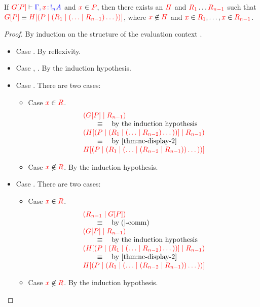\begin{lemma}\label{thm:nc-display-3}
  If $\seq[{ \cpPlug{G}{P} }]{ \Gamma, \tmty{x}{\take[n]{A}} }$ and
  $\freeIn{x}{P}$, then there exists an $\tm{H}$ and $\tm{R_1}\dots\tm{R_{n-1}}$
  such that $\tm{\cpPlug{G}{P}} \equiv
  \tm{\cpPlug{H}{\ncPool{P}{\ncPool{R_1}{\ncPool{\dots}{R_{n-1}}\dots}}}}$,
  where $\notFreeIn{x}{H}$ and $\freeIn{x}{R_1},\dots,\freeIn{x}{R_{n-1}}$.
\end{lemma}
\begin{proof}
  By induction on the structure of the evaluation context .
  \begin{itemize}
  \item Case \tm{\Box}. By reflexivity.
  \item Case , . By the induction hypothesis.
  \item Case . There are two cases:
    \begin{itemize}
    \item Case $\freeIn{x}{R}$.
      \[
        \begin{array}{l}
          \tm{\ncPool{\cpPlug{G}{P}}{R_{n-1}}} \\
          \qquad \equiv \quad \text{by the induction hypothesis} \\ 
          \tm{\ncPool{\cpPlug{H}{\ncPool{P}{\ncPool{R_1}{\ncPool{\dots}{R_{n-2}}\dots}}}}{R_{n-1}}} \\
          \qquad \equiv \quad \text{by \cref{thm:nc-display-2}} \\
          \tm{\cpPlug{H}{\ncPool{P}{\ncPool{R_1}{\ncPool{\dots}{\ncPool{R_{n-2}}{R_{n-1}}}\dots}}}}
        \end{array}
      \]
    \item Case $\notFreeIn{x}{R}$. By the induction hypothesis.
    \end{itemize}
  \item Case . There are two cases:
    \begin{itemize}
    \item Case $\freeIn{x}{R}$.
      \[
        \begin{array}{ll}
          \tm{\ncPool{R_{n-1}}{\cpPlug{G}{P}}} \\
          \qquad \equiv \quad \text{by} \; \ncEquivPoolComm \\ 
          \tm{\ncPool{\cpPlug{G}{P}}{R_{n-1}}} \\
          \qquad \equiv \quad \text{by the induction hypothesis} \\ 
          \tm{\ncPool{\cpPlug{H}{\ncPool{P}{\ncPool{R_1}{\ncPool{\dots}{R_{n-2}}\dots}}}}{R_{n-1}}} \\
          \qquad \equiv \quad \text{by \cref{thm:nc-display-2}} \\
          \tm{\cpPlug{H}{\ncPool{P}{\ncPool{R_1}{\ncPool{\dots}{\ncPool{R_{n-2}}{R_{n-1}}}\dots}}}}
        \end{array}
      \]
    \item Case $\notFreeIn{x}{R}$. By the induction hypothesis.
    \end{itemize}
  \end{itemize}
\end{proof}

